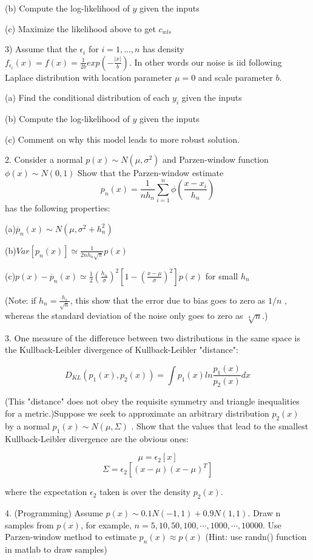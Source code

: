 \documentclass{article}
\theoremstyle{definition}
\theoremstyle{definition}
\theoremstyle{remark}
\begin{document}
\qquad (b) Compute the log-likelihood of $y$ given the inputs

\qquad (c) Maximize the likelihood above to get $c_{wls}$


3) Assume that the $\epsilon _i$ for $i=1,...,n$ has density $f_{\epsilon_i}(x)=f(x)=\frac{1}{2b}exp(-\frac{|x|}{b})$. In other words our noise is iid following Laplace distribution with location parameter $\mu =0$ and scale parameter $b$.

\qquad (a) Find the conditional distribution of each $y_i$ given the inputs

\qquad (b) Compute the log-likelihood of $y$ given the inputs

\qquad (c) Comment on why this model leads to more robust solution.


2.  Consider a normal $p(x)\sim N(\mu,\sigma^2)$ and Parzen-window function $\phi(x)\sim N(0,1)$ Show that the Parzen-window estimate
$$
p_n(x) = \frac{1}{nh_n}\sum_{i=1}^{n}\phi(\frac{x-x_i}{h_n})
$$
has the following properties:

(a)$\overline{p}_n(x)\sim N(\mu,\sigma^2+h_n^2)$

(b)$Var[p_n(x)] \simeq \frac{1}{2nh_n\sqrt{\pi}}p(x)$

(c)$p(x)-\overline{p}_n(x)\simeq \frac{1}{2}(\frac{h_n}{\sigma})^2[1-(\frac{x-\mu}{\sigma})^2]p(x)$ for small $h_n $

(Note: if $h_n = \frac{h_1}{\sqrt n} $, this show that the error due to bias goes to zero as $1/n $ , whereas the
standard deviation of the noise only goes to zero as ${\sqrt[4]{n}} $.)


3.  One measure of the difference between two distributions in the same space is the
Kullback-Leibler divergence of Kullback-Leibler "distance":

$$
D_{KL}(p_1(x),p_2(x)) = \int p_1(x)ln\frac{p_1(x)}{p_2(x)}dx
$$


(This "distance" does not obey the requisite symmetry and triangle inequalities for a metric.)Suppose we seek to approximate an arbitrary distribution $p_2(x)$ by a normal $p_1(x)\sim N(\mu,\Sigma)$ .
Show that the values that lead to the smallest Kullback-Leibler divergence are the obvious ones:

$$
\mu = \epsilon_2[x]
$$
$$
\Sigma = \epsilon_2[(x-\mu)(x-\mu)^T]
$$

where the expectation $\epsilon_2$ taken is over the density $p_2(x)$.


4. (Programming) Assume  $p(x)\sim0.1N(-1,1)+0.9N(1,1)$.  Draw n samples from $p(x)$, for example, $n=5,10,50,100,\cdots,1000,\cdots,10000$. Use Parzen-window method to estimate $p_n(x)\approx p(x)$ (Hint: use randn() function in matlab to draw samples)
\end{document}
